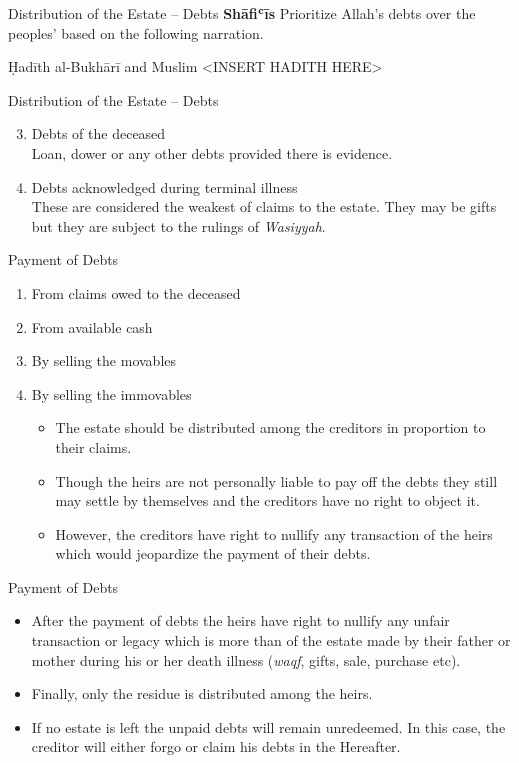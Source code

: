 \begin{frame}{Distribution of the Estate -- Debts}
\textbf{Shāfiʿīs} Prioritize Allah's debts over the peoples' based on the following narration.
\begin{block}{Ḥadīth \hfill al-Bukhārī and Muslim}
<INSERT HADITH HERE>
\end{block}
\end{frame}

\begin{frame}{Distribution of the Estate -- Debts}
\begin{enumerate}[A]
\setcounter{enumi}{2}
\item Debts of the deceased\\
Loan, dower or any other debts provided there is evidence.
\item Debts acknowledged during terminal illness\\
These are considered the weakest of claims to the estate. They may be gifts but they are subject to the rulings of \textit{Wasiyyah}.
\end{enumerate}
\end{frame}

\begin{frame}{Payment of Debts}
\begin{enumerate}
\item From claims owed to the deceased
\item From available cash
\item By selling the movables
\item By selling the immovables\\
\begin{itemize}
\item The estate should be distributed among the creditors in proportion to their claims.
\item Though the heirs are not personally liable to pay off the debts they still may settle by themselves and the creditors have no right to object it. 
\item However, the creditors have right to nullify any transaction of the heirs which would jeopardize the payment of their debts.
\end{itemize}
\end{enumerate}
\end{frame}

\begin{frame}{Payment of Debts}
\begin{itemize}
\item After the payment of debts the heirs have right to nullify any unfair transaction or legacy which is more than  of the estate made by their father or mother during his or her death illness (\textit{waqf}, gifts, sale, purchase etc).
\item Finally, only the residue is distributed among the heirs.
\item If no estate is left the unpaid debts will remain unredeemed. In this case, the creditor will either forgo or claim his debts in the Hereafter.
\end{itemize}
\end{frame}

